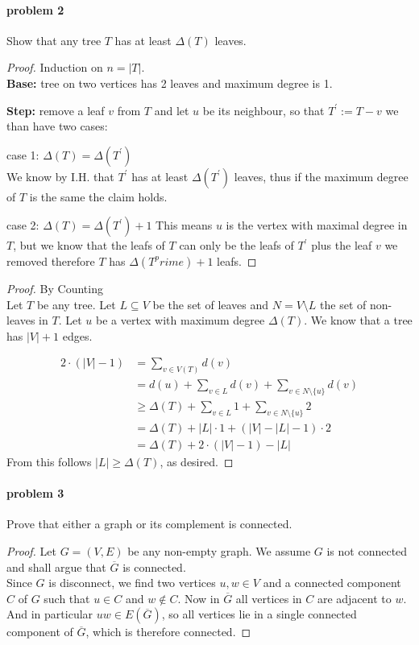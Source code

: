 \paragraph{problem 2} 
Show that any tree $ T $ has at least $ \Delta(T) $ leaves. 
\begin{proof}
Induction on $ n = |T| $.
\\
\textbf{Base:} tree on two vertices has 2 leaves and maximum degree is 1.

\smallskip
\noindent \textbf{Step:} remove a leaf $ v $ from $ T $ and let $ u $ be its neighbour,
so that $ T^\prime := T - v $ we than have two cases:

\smallskip \noindent
case 1: $ \Delta(T) = \Delta(T^\prime) $ \\
We know by I.H. that $ T^\prime $ has at least $ \Delta(T^\prime) $ leaves, thus 
if the maximum degree of $ T $ is the same the claim holds.

\bigskip \noindent
case 2: $ \Delta(T) = \Delta(T^\prime) + 1 $
This means $ u $ is the vertex with maximal degree in $ T $, but we know that the
leafs of $ T $ can only be the leafs of $ T^\prime $ plus the leaf $ v $ we removed
therefore $ T $ has $ \Delta(T^prime) + 1 $ leafs.

\end{proof}
\begin{proof} By Counting $ $ \\
Let $ T $ be any tree. Let $ L \subseteq V $ be the set of leaves and 
$ N = V \setminus L $ the set of non-leaves in $ T $. Let $ u $ be a vertex 
with maximum degree $ \Delta(T) $. We know that a tree has $ |V| + 1 $ edges.

\begin{align}
    2 \cdot (|V| - 1) &= \sum_{v \in V(T)} d(v) \\
    &= d(u) + \sum_{v \in L} d(v) + \sum_{v \in N \setminus \{u\}} d(v) \\
    &\geq \Delta(T) + \sum_{v \in L} 1 + \sum_{v \in N \setminus \{u\}} 2 \\
    &= \Delta(T) + |L| \cdot 1 + (|V| - |L| - 1) \cdot 2  \\
    &= \Delta(T) + 2 \cdot (|V| - 1) - |L|
\end{align}
From this follows $ |L| \geq \Delta(T) $, as desired.
\end{proof}

\paragraph{problem 3}
Prove that either a graph or its complement is connected.
\begin{proof}
    Let $ G = (V,E) $ be any non-empty graph. We assume $ G $ is not connected and 
    shall argue that $ \overline{G} $ is connected. \\
    Since $ G $ is disconnect, we find two vertices $ u,w \in V $ and a connected
    component $ C $ of $ G $ such that $ u \in C $ and $ w \notin C $. Now in 
    $ \overline{G} $ all vertices in $ C $ are adjacent to $ w $. And in 
    particular $ uw \in E(\overline{G}) $, so all vertices lie in a single connected
    component of $ \overline{G} $, which is therefore connected.
\end{proof}


